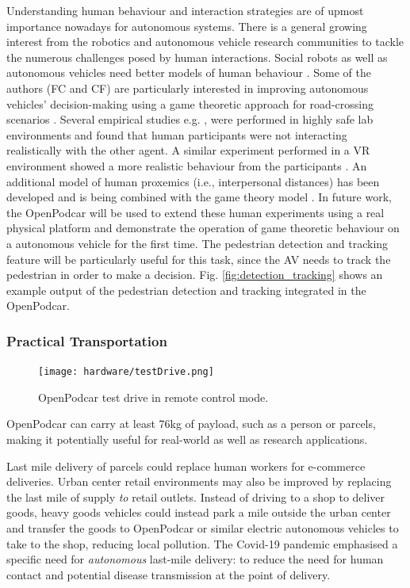 \documentclass[a4paper]{article}
\begin{document}
	Understanding human behaviour and interaction strategies are of upmost importance nowadays for autonomous systems. There is a general growing interest from the robotics and autonomous vehicle research communities to tackle the numerous challenges posed by human interactions. Social robots as well as autonomous vehicles need better models of human behaviour \cite{camara2020pedestrian, camara2020pedestriana}. Some of the authors (FC and CF) are particularly interested in improving autonomous vehicles' decision-making using a game theoretic approach for road-crossing scenarios \cite{fox2018when}. Several empirical studies e.g. \cite{camara2018towards, camara2020continuous, camara2018empirical}, were performed in highly safe lab environments and found that human participants were not interacting realistically with the other agent. A similar experiment performed in a VR environment showed a more realistic behaviour from the participants \cite{camara2021evaluating, camara2019towards}. An additional model of human proxemics (i.e., interpersonal distances) has been developed and is being combined with the game theory model \cite{camara2020space, camaraextending}. In future work, the OpenPodcar will be used to extend these human experiments using a real physical platform and demonstrate the operation of game theoretic behaviour on a autonomous vehicle for the first time. The pedestrian detection and tracking feature will be particularly useful for this task, since the AV needs to track the pedestrian in order to make a decision. Fig. \ref{fig:detection_tracking} shows an example output of the pedestrian detection and tracking integrated in the OpenPodcar.
	
	
	\subsubsection{Practical Transportation}
	
	\begin{figure}
		\centering
		\texttt{[image: hardware/testDrive.png]}
		\caption{OpenPodcar test drive in remote control mode.}
		\label{fig:testDrive}
	\end{figure}
	
	OpenPodcar can carry at least 76kg of payload, such as a person or parcels, making it potentially useful for real-world as well as research applications.
	
	Last mile delivery of parcels could replace human workers for e-commerce deliveries. Urban center retail environments may also be improved by replacing the last mile of supply {\em to} retail outlets. Instead of driving to a shop to deliver goods, heavy goods vehicles could instead park a mile outside the urban center and transfer the goods to OpenPodcar or similar electric autonomous vehicles to take to the shop, reducing local pollution. The Covid-19 pandemic emphasised a specific need for {\em autonomous} last-mile delivery: to reduce the need for human contact and potential disease transmission at the point of delivery.
	
\end{document}

